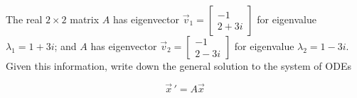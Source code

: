 \documentclass[addpoints,12pt]{exam}
\newcommand{\vv}[2]{\begin{bmatrix} #1 \\ #2 \end{bmatrix}}
\begin{document}
\begin{questions}
 
 \newpage
 
 \question[3] The real $2\times2$ matrix $A$  has eigenvector $\vec v_1=\vv{-1}{2+3i}$ for eigenvalue $\lambda_1=1+3i$; and $A$ has eigenvector  $\vec v_2=\vv{-1}{2-3i}$ for eigenvalue $\lambda_2=1-3i$. Given this information, write down the general solution to the system of ODEs
 
 $$\vec x\,'=A\vec x$$
 
 
 
 
 
\end{questions}
\end{document}
